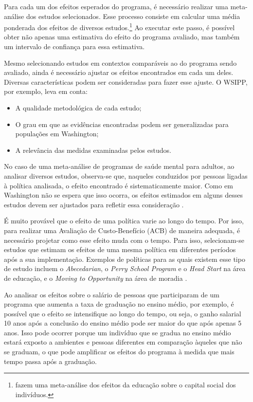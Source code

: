 \documentclass[12pt,letterpaper]{article}
\newcommand{\1}{\mathbbm{1}}
\numberwithin{equation}{section}
\begin{document}
Para cada um dos efeitos esperados do programa, é necessário realizar uma meta-análise dos estudos selecionados. Esse processo consiste em calcular uma média ponderada dos efeitos de diversos estudos.\footnote{\cite{Huang2008meta} fazem uma meta-análise dos efeitos da educação sobre o capital social dos indivíduos.} Ao executar este passo, é possível obter não apenas uma estimativa do efeito do programa avaliado, mas também um intervalo de confiança para essa estimativa.

Mesmo selecionando estudos em contextos comparáveis ao do programa sendo avaliado, ainda é necessário ajustar os efeitos encontrados em cada um deles. Diversas características podem ser consideradas para fazer esse ajuste. O WSIPP, por exemplo, leva em conta:

\begin{itemize}
    \item A qualidade metodológica de cada estudo;
    \item O grau em que as evidências encontradas podem ser generalizadas para populações em Washington;
    \item A relevância das medidas examinadas pelos estudos.
\end{itemize}

No caso de uma meta-análise de programas de saúde mental para adultos, ao analisar diversos estudos, observa-se que, naqueles conduzidos por pessoas ligadas à política analisada, o efeito encontrado é sistematicamente maior. Como em Washington não se espera que isso ocorra, os efeitos estimados em alguns desses estudos devem ser ajustados para refletir essa consideração \cite{wsipp_estimating_nodate}.

É muito provável que o efeito de uma política varie ao longo do tempo. Por isso, para realizar uma Avaliação de Custo-Benefício (ACB) de maneira adequada, é necessário projetar como esse efeito muda com o tempo. Para isso, selecionam-se estudos que estimam os efeitos de uma mesma política em diferentes períodos após a sua implementação. Exemplos de políticas para as quais existem esse tipo de estudo incluem o \textit{Abecedarian}, o \textit{Perry School Program} e o \textit{Head Start} na área de educação, e o \textit{Moving to Opportunity} na área de moradia \cite{chetty_effects_2016,ludwig_long-term_2013,garcia_lasting_2021,heckman_rate_2010,bailey_prep_2021}.

Ao analisar os efeitos sobre o salário de pessoas que participaram de um programa que aumenta a taxa de graduação no ensino médio, por exemplo, é possível que o efeito se intensifique ao longo do tempo, ou seja, o ganho salarial 10 anos após a conclusão do ensino médio pode ser maior do que após apenas 5 anos. Isso pode ocorrer porque um indivíduo que se gradua no ensino médio estará exposto a ambientes e pessoas diferentes em comparação àqueles que não se graduam, o que pode amplificar os efeitos do programa à medida que mais tempo passa após a graduação.
\end{document}
